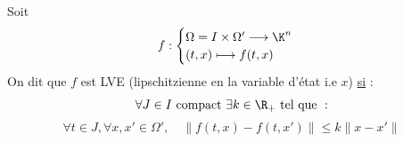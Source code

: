 \begin{definition}
    Soit 
    \[ f : 
        \begin{cases}
            \Omega = I \times \Omega' \longrightarrow \K^n \\ 
            (t,x) \longmapsto f(t,x)
        \end{cases} \] 
    On dit que $f$ est LVE (lipschitzienne en la variable d'état i.e $x$) \underline{si} :
    \[ \forall J \in I \text{ compact } \exists k \in \R_+ \text{ tel que } : \] 
    \[ \forall t \in J, \forall x, x' \in \Omega', \quad \boxed{\| f(t,x) - f(t,x')\| \leqslant k \| x - x' \| } \]  
\end{definition}

